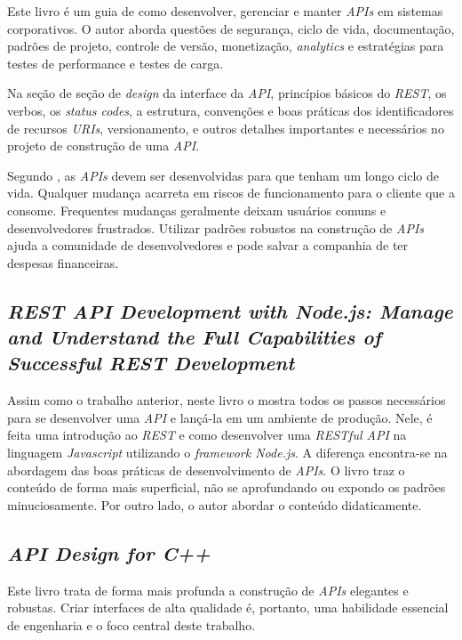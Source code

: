 Este livro é um guia de como desenvolver, gerenciar e manter \textit{APIs} em sistemas corporativos. O autor aborda questões de segurança, ciclo de vida, documentação, padrões de projeto, controle de versão, monetização, \textit{analytics} e estratégias para testes de performance e testes de carga.

Na seção de seção de \textit{design} da interface da \textit{API}, princípios básicos do \textit{REST}, os verbos, os \textit{status codes}, a estrutura, convenções e boas práticas dos identificadores de recursos \textit{URIs}, versionamento, e outros detalhes importantes e necessários no projeto de construção de uma \textit{API}.

Segundo \cite{De2017}, as \textit{APIs} devem ser desenvolvidas para que tenham um longo ciclo de vida. Qualquer mudança acarreta em riscos de funcionamento para o cliente que a consome. Frequentes mudanças geralmente deixam usuários comuns e desenvolvedores frustrados. Utilizar padrões robustos na construção de \textit{APIs} ajuda a comunidade de desenvolvedores e pode salvar a companhia de ter despesas financeiras.

\subsection{\textit{REST API Development with Node.js: Manage and Understand the Full Capabilities of Successful REST Development}}

Assim como o trabalho anterior, neste livro o \cite{Doglio:2018} mostra todos os passos necessários para se desenvolver uma \textit{API} e lançá-la em um ambiente de produção. Nele, é feita uma introdução ao \textit{REST} e como desenvolver uma \textit{RESTful API} na linguagem \textit{Javascript} utilizando o \textit{framework Node.js}. A diferença encontra-se na abordagem das boas práticas de desenvolvimento de \textit{APIs}. O livro traz o conteúdo de forma mais superficial, não se aprofundando ou expondo os padrões minuciosamente. Por outro lado, o autor abordar o conteúdo didaticamente.

\subsection{\textit{API Design for C++}}

Este livro trata de forma mais profunda a construção de \textit{APIs} elegantes e robustas. Criar interfaces de alta qualidade é, portanto, uma habilidade essencial de engenharia e o foco central deste trabalho. \cite{Reddy2011}

